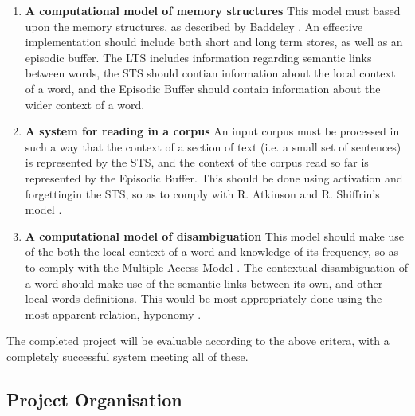 \documentclass[]{article}
\begin{document}
\begin{enumerate}
	\item \textbf{A computational model of memory structures} \newline
		This model must based upon the memory structures, as described by Baddeley \cite{MemoryBaddeleyEysenkAnderson}. An effective implementation should include both short and long term stores, as well as an episodic buffer. The LTS includes information regarding semantic links between words, the STS should contian information about the local context of a word, and the Episodic Buffer should contain information about the wider context of a word.
	
	\item \textbf{A system for reading in a corpus} \newline
	An input corpus must be processed in such a way that the context of a section of text (i.e. a small set of sentences) is represented by the STS, and the context of the corpus read so far is represented by the Episodic Buffer. This should be done using activation and forgettingin the STS, so as to comply with R. Atkinson and R. Shiffrin's model \cite{ControlProcessesSTMAtkinson}.
		
	
	\item \textbf{A computational model of disambiguation} \newline
	This model should make use of the both the local context of a word and knowledge of its frequency, so as to comply with \hyperref[sec:DisambiguationModels]{the Multiple Access Model} \cite{PsychologyOfLanguage}. The contextual disambiguation of a word should make use of the semantic links between its own, and other local words definitions. This would be most appropriately done using the most apparent relation, \hyperref[Hypernym]{hyponomy} \cite{WN2Nouns, WN4Verbs}.
	
\end{enumerate}

The completed project will be evaluable according to the above critera, with a completely successful system meeting all of these.

\subsection{Project Organisation}
\label{sec:ProjectOrg}
\end{document}

